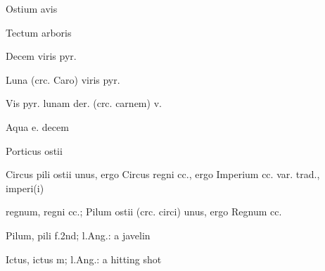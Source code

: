  {} {\mktsStyleItalic{}Ostium avis\/}


 {} {\mktsStyleItalic{}Tectum arboris\/}


 {} {\mktsStyleItalic{}Decem viris pyr.\/}


 {} {\mktsStyleItalic{}Luna\/} (crc. {\mktsStyleItalic{}Caro\/}) {\mktsStyleItalic{}viris pyr.\/}


 {} {\mktsStyleItalic{}Vis pyr. lunam der.\/} (crc. {\mktsStyleItalic{}carnem\/}) {\mktsStyleItalic{}v.\/}


 {} {\mktsStyleItalic{}Aqua e. decem\/}


 {\mktsStyleItalic{}Porticus ostii\/}


 {} {\mktsStyleItalic{}Circus pili ostii unus\/}, ergo {\mktsStyleItalic{}Circus regni cc.\/}, ergo {\mktsStyleItalic{}Imperium cc.\/} var. {\mktsStyleItalic{}trad.\/}, imperi(i)


 {} regnum, regni cc.; Pilum ostii (crc. circi) unus, ergo Regnum cc.


 {\mktsStyleItalic{}Pilum\/}, pili {\mktsStyleItalic{}f.2nd\/}; l.Ang.: a javelin


 {\mktsStyleItalic{}Ictus\/}, ictus {\mktsStyleItalic{}m\/}; l.Ang.: a hitting shot


